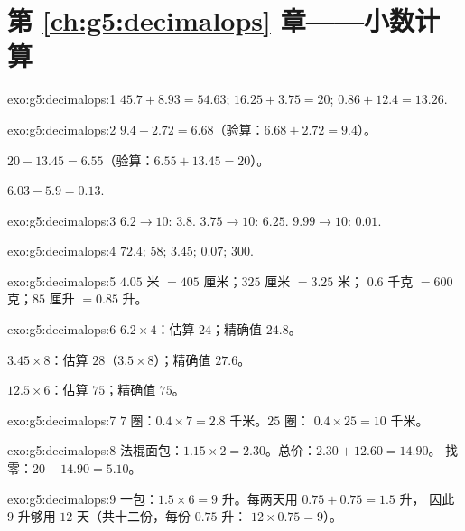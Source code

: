\section*{第 \ref{ch:g5:decimalops} 章——小数计算}

\begin{solution}{exo:g5:decimalops:1}
$45.7 + 8.93 = 54.63$; \quad
$16.25 + 3.75 = 20$; \quad
$0.86 + 12.4 = 13.26$.
\end{solution}

\begin{solution}{exo:g5:decimalops:2}
$9.4 - 2.72 = 6.68$（验算：$6.68 + 2.72 = 9.4$）。

$20 - 13.45 = 6.55$（验算：$6.55 + 13.45 = 20$）。

$6.03 - 5.9 = 0.13$.
\end{solution}

\begin{solution}{exo:g5:decimalops:3}
$6.2 \to 10$: $3.8$. \quad $3.75 \to 10$: $6.25$. \quad
$9.99 \to 10$: $0.01$.
\end{solution}

\begin{solution}{exo:g5:decimalops:4}
$72.4$; \quad $58$; \quad $3.45$; \quad $0.07$; \quad $300$.
\end{solution}

\begin{solution}{exo:g5:decimalops:5}
$4.05$ 米 $= 405$ 厘米；\quad $325$ 厘米 $= 3.25$ 米；\quad
$0.6$ 千克 $= 600$ 克；\quad $85$ 厘升 $= 0.85$ 升。
\end{solution}

\begin{solution}{exo:g5:decimalops:6}
$6.2 \times 4$：估算 $24$；精确值 $24.8$。

$3.45 \times 8$：估算 $28$（$3.5 \times 8$）；精确值 $27.6$。

$12.5 \times 6$：估算 $75$；精确值 $75$。
\end{solution}

\begin{solution}{exo:g5:decimalops:7}
$7$ 圈：$0.4 \times 7 = 2.8$ 千米。$25$ 圈：
$0.4 \times 25 = 10$ 千米。
\end{solution}

\begin{solution}{exo:g5:decimalops:8}
法棍面包：$1.15 \times 2 = 2.30$。总价：$2.30 + 12.60 = 14.90$。
找零：$20 - 14.90 = 5.10$。
\end{solution}

\begin{solution}{exo:g5:decimalops:9}
一包：$1.5 \times 6 = 9$ 升。每两天用 $0.75 + 0.75 = 1.5$ 升，
因此 $9$ 升够用 $12$ 天（共十二份，每份 $0.75$ 升：
$12 \times 0.75 = 9$）。
\end{solution}

